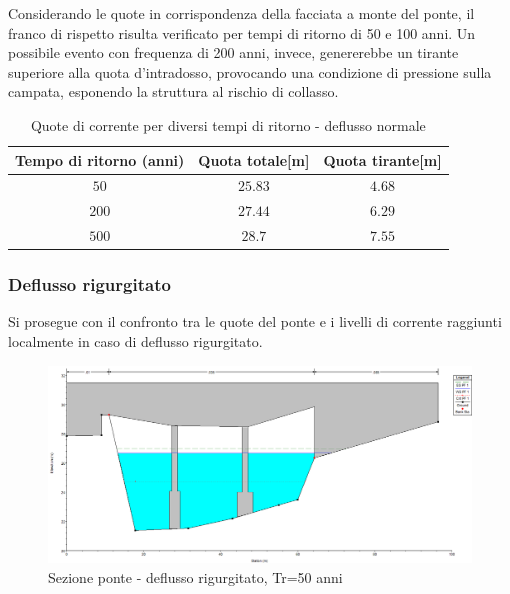 \documentclass[12pt]{article} %
\begin{document}
\noindent Considerando le quote in corrispondenza della facciata a monte del ponte, il franco di rispetto risulta verificato per tempi di ritorno di 50 e 100 anni.
Un possibile evento con frequenza di 200 anni, invece, genererebbe un tirante superiore alla quota d'intradosso, provocando una condizione di pressione sulla campata, esponendo la struttura al rischio di collasso.

\begin{table}[H]
    \centering
    \begin{tabular}{|c|c|c|}
        \hline
        \textbf{Tempo di ritorno (anni)} & \textbf{Quota totale[m]}&\textbf{Quota tirante[m]} \\
        \hline
        $50$ & $25.83$ & $4.68$\\
        $200$ & $27.44$ & $6.29$\\
        $500$ & $28.7$ & $7.55$\\
        \hline
    \end{tabular}
    \caption{Quote di corrente per diversi tempi di ritorno - deflusso normale}
\end{table}

\newpage

\subsubsection{Deflusso rigurgitato}

\noindent Si prosegue con il confronto tra le quote del ponte e i livelli di corrente raggiunti localmente in caso di deflusso rigurgitato.

\begin{figure}[H]
    \centering
    \includegraphics[scale=0.5]{PonteUP56.PNG}
    \caption{Sezione ponte - deflusso rigurgitato, Tr=50 anni}
\end{figure}
\end{document}
